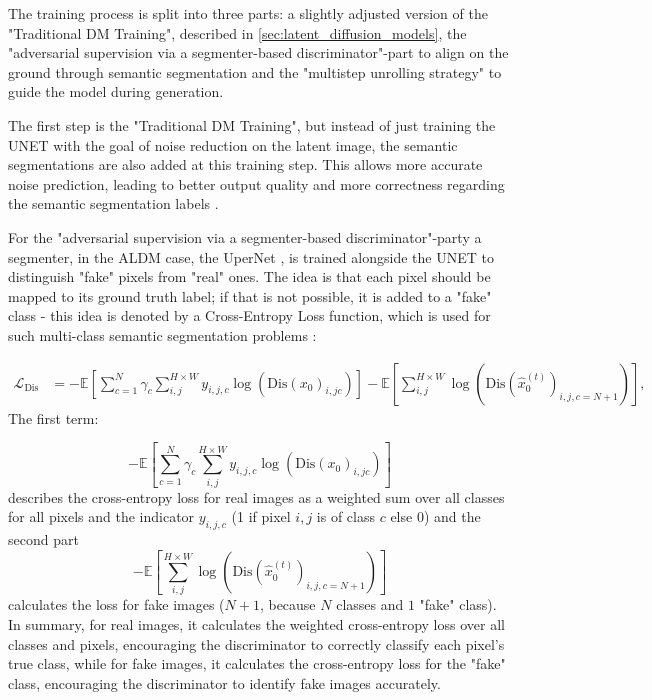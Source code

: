 The training process is split into three parts: a slightly adjusted version of the "Traditional DM Training"\cite{li2024aldm}, described in \autoref{sec:latent_diffusion_models}, the "adversarial supervision via a segmenter-based discriminator"-part \cite{li2024aldm} to align on the ground through semantic segmentation and the "multistep unrolling strategy"\cite{li2024aldm} to guide the model during generation.

The first step is the "Traditional DM Training",\cite{li2024aldm} but instead of just training the UNET \cite{ronneberger2015unetconvolutionalnetworksbiomedical} with the goal of noise reduction on the latent image, the semantic segmentations are also added at this training step. This allows more accurate noise prediction, leading to better output quality and more correctness regarding the semantic segmentation labels \cite{li2024aldm}. 

For the "adversarial supervision via a segmenter-based discriminator"-party a segmenter, in the ALDM case, the UperNet \cite{xiao2018unifiedperceptualparsingscene}, is trained alongside the UNET \cite{ronneberger2015unetconvolutionalnetworksbiomedical} to distinguish "fake" pixels from "real" ones. The idea is that each pixel should be mapped to its ground truth label; if that is not possible, it is added to a "fake" class - this idea is denoted by a Cross-Entropy Loss function, which is used for such multi-class semantic segmentation problems \cite{sushko2021needadversarialsupervisionsemantic}:

\begin{align} \label{eq:discriminator-loss}
\mathcal{L}_{\text{Dis}} &= -\mathbb{E}\left[ \sum_{c=1}^{N}\gamma_c
 \sum_{i,j}^{H \times W} y_{i,j,c} \log \left(\text{Dis}(x_0)_{i,jc}\right)
\right] 
-\mathbb{E}\left[ \sum_{i,j}^{H\times W}  \log \left( \text{Dis}(\hat{x}_0^{(t)})_{i,j,c=N+1} \right)
\right], 
\end{align}
The first term:

\begin{equation}
    -\mathbb{E}\left[ \sum_{c=1}^{N}\gamma_c
 \sum_{i,j}^{H \times W} y_{i,j,c} \log \left(\text{Dis}(x_0)_{i,jc}\right)
\right]
\end{equation}
describes the cross-entropy loss for real images as a weighted sum over all classes for all pixels and the indicator $y_{i,j,c}$ (1 if pixel $i,j$ is of class $c$ else 0) and the second part 
\begin{equation}
  -\mathbb{E}\left[ \sum_{i,j}^{H\times W}  \log \left( \text{Dis}(\hat{x}_0^{(t)})_{i,j,c=N+1} \right)
\right]  
\end{equation}
calculates the loss for fake images ($N + 1$, because $N$ classes and $1$ "fake" class). In summary, for real images, it calculates the weighted cross-entropy loss over all classes and pixels, encouraging the discriminator to correctly classify each pixel's true class, while for fake images, it calculates the cross-entropy loss for the "fake" class, encouraging the discriminator to identify fake images accurately.

